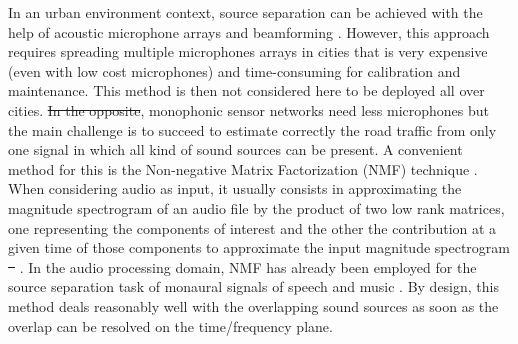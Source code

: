 \documentclass[twocolumn]{svjour3}          %
\providecommand{\DIFaddtex}[1]{{\protect\color{blue}\uwave{#1}}} %
\providecommand{\DIFdeltex}[1]{{\protect\color{red}\sout{#1}}}                      %
\providecommand{\DIFaddbegin}{} %
\providecommand{\DIFaddend}{} %
\providecommand{\DIFdelbegin}{} %
\providecommand{\DIFdelend}{} %
\providecommand{\DIFadd}[1]{\texorpdfstring{\DIFaddtex{#1}}{#1}} %
\providecommand{\DIFdel}[1]{\texorpdfstring{\DIFdeltex{#1}}{}} %
\begin{document}
In an urban environment context, source separation can be achieved with the help of acoustic microphone arrays and beamforming \cite{saruwatari2003blind}. However, this approach requires spreading multiple microphones arrays in cities that is very expensive (even with low cost microphones) and time-consuming for calibration and maintenance. This method is then not considered here to be deployed all over cities. \DIFdelbegin \DIFdel{In the opposite}\DIFdelend \DIFaddbegin \DIFadd{On the contrary}\DIFaddend , monophonic sensor networks need less microphones but the main challenge is to succeed to estimate correctly the road traffic from only one signal in which all kind of sound sources can be present. A convenient method for this is the  Non-negative Matrix Factorization (NMF) technique \cite{lee_learning_1999}. When considering audio as input, it usually consists in approximating the magnitude spectrogram of an audio file by the product of two low rank matrices, one representing the components of interest and the other the contribution at a given time of those components to approximate the input magnitude spectrogram \cite{smaragdis_non-negative_2003} \cite{wilson_speech_2008}\DIFdelbegin \DIFdel{\mbox{%
\cite{mesaros_sound_2015}}%
}\DIFdelend . In the audio processing domain, NMF has already been employed for the source separation task of monaural signals of speech and music \cite{wang_musical_2005} \cite{wilson_speech_2008}. By design, this method deals reasonably well with the overlapping sound sources as soon as the overlap can be resolved on the time/frequency plane.
\end{document}
